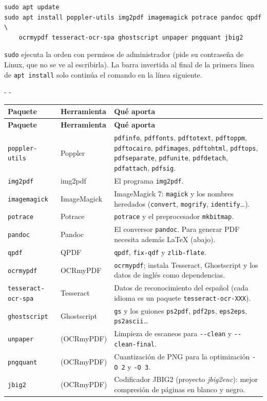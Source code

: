 \documentclass[11pt,a4paper]{article}
\makeatletter
\newcommand{\necesitaespacio}[1]{\par\penalty-100\begingroup
	\setlength{\dimen@}{#1}\dimen@ii\pagegoal\advance\dimen@ii-\pagetotal
	\ifdim\dimen@>\dimen@ii\ifdim\dimen@ii>\z@\vfil\fi\penalty-\@M\fi\endgroup}
\newcommand{\cmd}[1]{\texttt{\textcolor{colcmd}{#1}}}      %
\newcommand{\opt}[1]{\texttt{\textcolor{colopt}{#1}}}      %
\newcommand{\cab}[1]{\textbf{#1}}
\makeatother
\begin{document}
	\begin{lstlisting}
sudo apt update
sudo apt install poppler-utils img2pdf imagemagick potrace pandoc qpdf \
    ocrmypdf tesseract-ocr-spa ghostscript unpaper pngquant jbig2
\end{lstlisting}
	
	\cmd{sudo} ejecuta la orden con permisos de administrador (pide su contraseña de Linux, que no se ve al escribirla). La barra invertida al final de la primera línea de \cmd{apt install} solo continúa el comando en la línea siguiente.
	
	\begingroup\small
	\necesitaespacio{10\baselineskip}
	\begin{longtable}{L{3.6cm}L{2.6cm}L{8.86cm}}
		\toprule{}\cab{Paquete} & \cab{Herramienta} & \cab{Qué aporta}\\\midrule
		\endfirsthead
		\toprule\rowcolor{tablacab}\cab{Paquete} & \cab{Herramienta} & \cab{Qué aporta}\\\midrule
		\endhead
		\bottomrule
		\endfoot
		\texttt{poppler-utils} & Poppler & \cmd{pdfinfo}, \cmd{pdffonts}, \cmd{pdftotext}, \cmd{pdftoppm}, \cmd{pdftocairo}, \cmd{pdfimages}, \cmd{pdftohtml}, \cmd{pdftops}, \cmd{pdfseparate}, \cmd{pdfunite}, \cmd{pdfdetach}, \cmd{pdfattach}, \cmd{pdfsig}.\\*
		\texttt{img2pdf} & img2pdf & El programa \cmd{img2pdf}.\\
		\texttt{imagemagick} & ImageMagick & ImageMagick 7: \cmd{magick} y los nombres heredados (\cmd{convert}, \cmd{mogrify}, \cmd{identify}\ldots).\\
		\texttt{potrace} & Potrace & \cmd{potrace} y el preprocesador \cmd{mkbitmap}.\\
		\texttt{pandoc} & Pandoc & El conversor \cmd{pandoc}. Para generar PDF necesita además LaTeX (abajo).\\
		\texttt{qpdf} & QPDF & \cmd{qpdf}, \cmd{fix-qdf} y \cmd{zlib-flate}.\\
		\texttt{ocrmypdf} & OCRmyPDF & \cmd{ocrmypdf}; instala Tesseract, Ghostscript y los datos de inglés como dependencias.\\
		\texttt{tesseract-\allowbreak{}ocr-\allowbreak{}spa} & Tesseract & Datos de reconocimiento del español (cada idioma es un paquete \texttt{tesseract-\allowbreak{}ocr-\allowbreak{}XXX}).\\
		\texttt{ghostscript} & Ghostscript & \cmd{gs} y los guiones \cmd{ps2pdf}, \cmd{pdf2ps}, \cmd{eps2eps}, \cmd{ps2ascii}\ldots\\
		\texttt{unpaper} & (OCRmyPDF) & Limpieza de escaneos para \opt{-{}-clean} y \opt{-{}-clean-final}.\\
		\texttt{pngquant} & (OCRmyPDF) & Cuantización de PNG para la optimización \opt{-O 2} y \opt{-O 3}.\\*
		\texttt{jbig2} & (OCRmyPDF) & Codificador JBIG2 (proyecto \emph{jbig2enc}): mejor compresión de páginas en blanco y negro.\\
	\end{longtable}
	\endgroup
	
\end{document}
